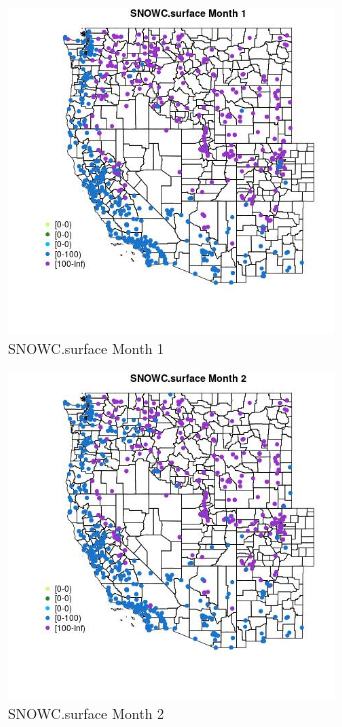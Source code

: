 \begin{figure} 
\centering  
\includegraphics[width=0.77\textwidth]{Code_Outputs/Report_ML_input_PM25_Step4_part_e_de_duplicated_aves_compiled_2019-05-21wNAs_MapObsMo1SNOWCsurface.jpg} 
\caption{\label{fig:Report_ML_input_PM25_Step4_part_e_de_duplicated_aves_compiled_2019-05-21wNAsMapObsMo1SNOWCsurface}SNOWC.surface Month 1} 
\end{figure} 
 

\begin{figure} 
\centering  
\includegraphics[width=0.77\textwidth]{Code_Outputs/Report_ML_input_PM25_Step4_part_e_de_duplicated_aves_compiled_2019-05-21wNAs_MapObsMo2SNOWCsurface.jpg} 
\caption{\label{fig:Report_ML_input_PM25_Step4_part_e_de_duplicated_aves_compiled_2019-05-21wNAsMapObsMo2SNOWCsurface}SNOWC.surface Month 2} 
\end{figure} 
 


